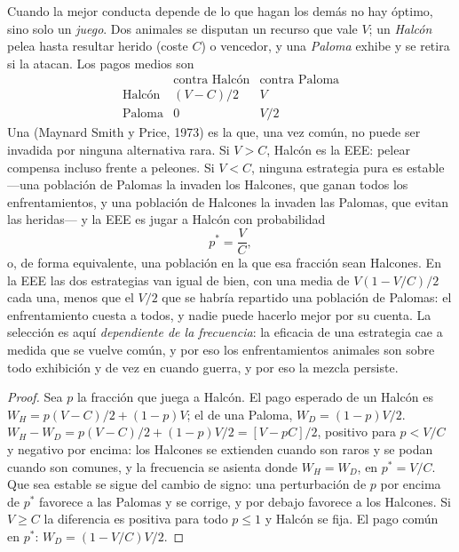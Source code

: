 \begin{proposition}\label{prop:b3:behavioural-ecology:hawk-dove}
Cuando la mejor conducta depende de lo que hagan los demás no hay
óptimo, sino solo un \emph{juego}. Dos animales se disputan un recurso
que vale $V$; un \emph{Halcón} pelea hasta resultar herido (coste $C$) o
vencedor, y una \emph{Paloma} exhibe y se retira si la atacan. Los pagos
medios son
\[
\begin{array}{c|cc}
 & \text{contra Halcón} & \text{contra Paloma}\\ \hline
\text{Halcón} & (V - C)/2 & V\\
\text{Paloma} & 0 & V/2
\end{array}
\]
Una \emph{} (Maynard Smith y Price,
1973) es la que, una vez común, no puede ser invadida por ninguna
alternativa rara. Si $V > C$, Halcón es la EEE: pelear compensa incluso
frente a peleones. Si $V
< C$, ninguna estrategia pura es estable ---una población de Palomas la
invaden los Halcones, que ganan todos los enfrentamientos, y una
población de Halcones la invaden las Palomas, que evitan las heridas---
y la EEE es jugar a Halcón con probabilidad
\[
p^{*} = \frac{V}{C},
\]
o, de forma equivalente, una población en la que esa fracción sean
Halcones. En la EEE las dos estrategias van igual de bien, con una
media de $V(1 -
V/C)/2$ cada una, menos que el $V/2$ que se habría repartido una
población de Palomas: el enfrentamiento cuesta a todos, y nadie puede
hacerlo mejor por su cuenta. La selección es aquí \emph{dependiente de
la frecuencia}: la eficacia de una estrategia cae a medida que se
vuelve común, y por eso los enfrentamientos animales son sobre todo
exhibición y de vez en cuando guerra, y por eso la mezcla persiste.
\end{proposition}
\begin{proof}
Sea $p$ la fracción que juega a Halcón. El pago esperado de un Halcón
es $W_{H} = p(V
- C)/2 + (1 - p)V$; el de una Paloma, $W_{D} = (1 - p)V/2$. $W_{H} - W_{D} =
p(V - C)/2 + (1 - p)V/2 = [V - pC]/2$, positivo para $p < V/C$ y
negativo por encima: los Halcones se extienden cuando son raros y se
podan cuando son comunes, y la frecuencia se asienta donde
$W_{H} = W_{D}$, en $p^{*} = V/C$. Que sea estable se sigue del cambio
de signo: una perturbación de $p$ por encima de $p^{*}$ favorece a las
Palomas y se corrige, y por debajo favorece a los Halcones. Si $V
\ge C$ la diferencia es positiva para todo $p \le 1$ y Halcón se fija.
El pago común en $p^{*}$: $W_{D} = (1 - V/C)V/2$.
\end{proof}

